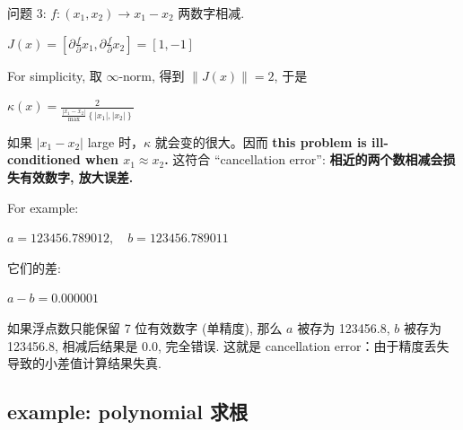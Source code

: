 \begin{example}

问题 3: \(f:\left( {x_{1},x_{2}} \right)\rightarrow x_{1} - x_{2}\) 两数字相减.

\(J(x) = \left\lbrack {\partial\frac{f}{\partial}x_{1},\partial\frac{f}{\partial}x_{2}} \right\rbrack = \left\lbrack {1, - 1} \right\rbrack\)

For simplicity, 取 \(\infty\)-norm, 得到 \(\left\| {J(x)} \right\| = 2\), 于是

\(\kappa(x) = \frac{2}{\frac{\left| {x_{1} - x_{2}} \right|}{\max}\left\{ {\left| x_{1} \right|,\left| x_{2} \right|} \right\}}\)

如果 \(\left| {x_{1} - x_{2}} \right|\) large 时，\(\kappa\) 就会变的很大。因而 \textbf{this problem is ill-conditioned when \(x_{1} \approx x_{2}\).} 这符合 ``cancellation error'': \textbf{相近的两个数相减会损失有效数字, 放大误差.}

For example:

\(a = 123456.789012,\quad b = 123456.789011\)

它们的差:

\(a - b = 0.000001\)

如果浮点数只能保留 7 位有效数字 (单精度), 那么 \(a\) 被存为 123456.8, \(b\) 被存为 123456.8, 相减后结果是 \(0.0\), 完全错误. 这就是 cancellation error：由于精度丢失导致的小差值计算结果失真.

\end{example}

\subsection{example: polynomial 求根}

